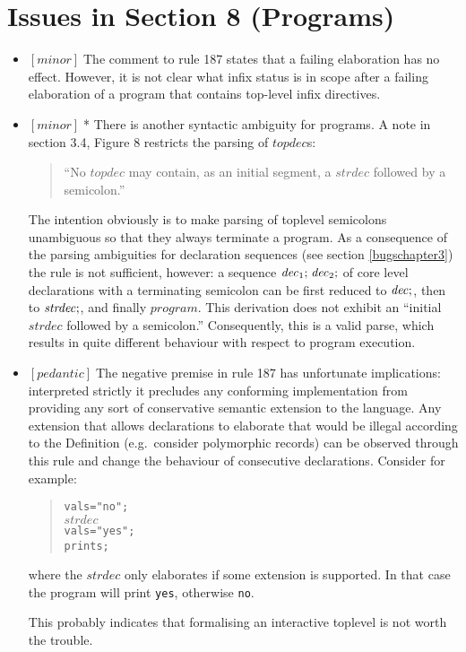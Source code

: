 \documentclass{article}
\newcommand{\m}[1]{$[\mathit{#1}]\;$}
\newcommand{\minor}{\m{minor}}
\newcommand{\pedantic}{\m{pedantic}}
\begin{document}
\section{Issues in Section 8 (Programs)}
\label{bugschapter8}

\begin{itemize}
\item \minor The comment to rule 187 states that a failing elaboration has no effect. However, it is not clear what infix status is in scope after a failing elaboration of a program that contains top-level infix directives.

\item \minor * There is another syntactic ambiguity for programs. A note in section 3.4, Figure 8 restricts the parsing of $\mathit{topdec}$s:
\begin{quote}
``No $\mathit{topdec}$ may contain, as an initial segment, a $\mathit{strdec}$ followed by a semicolon.''
\end{quote}
The intention obviously is to make parsing of toplevel semicolons unambiguous so that they always terminate a program. As a consequence of the parsing ambiguities for declaration sequences (see section \ref{bugschapter3}) the rule is not sufficient, however: a sequence $\mathit{dec}_1{\tt;}\;\mathit{dec}_2{\tt;}$ of core level declarations with a terminating semicolon can be first reduced to $\mathit{dec}{\tt;}$, then to $\mathit{strdec}{\tt;}$, and finally $\mathit{program}$. This derivation does not exhibit an ``initial $\mathit{strdec}$ followed by a semicolon.'' Consequently, this is a valid parse, which results in quite different behaviour with respect to program execution.

\item \pedantic The negative premise in rule 187 has unfortunate implications: interpreted strictly it precludes any conforming implementation from providing any sort of conservative semantic extension to the language. Any extension that allows declarations to elaborate that would be illegal according to the Definition (e.g.\ consider polymorphic records) can be observed through this rule and change the behaviour of consecutive declarations. Consider for example:
\begin{quote}
\begin{alltt}
val s = "no";
\(\mathit{strdec}\)
val s = "yes";
print s;
\end{alltt}
\end{quote}
where the $\mathit{strdec}$ only elaborates if some extension is supported. In that case the program will print {\tt yes}, otherwise {\tt no}.

This probably indicates that formalising an interactive toplevel is not worth the trouble.
\end{itemize}
\end{document}
